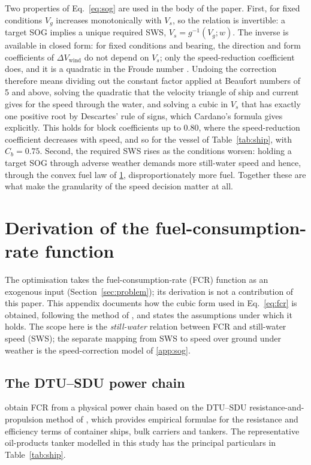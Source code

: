 \documentclass[review,authoryear]{elsarticle}
\begin{document}
Two properties of Eq.~\eqref{eq:sog} are used in the body of the paper. First, for fixed conditions
$V_g$ increases monotonically with $V_s$, so the relation is invertible: a target SOG implies a unique
required SWS, $V_s=g^{-1}(V_g;w)$. The inverse is available in closed form: for fixed conditions and
bearing, the direction and form coefficients of $\Delta V_{\text{wind}}$ do not depend on $V_s$; only
the speed-reduction coefficient does, and it is a quadratic in the Froude number
\citep[Table~3]{yang2020}. Undoing the correction therefore means dividing out the constant factor
applied at Beaufort numbers of 5 and above, solving the quadratic that the velocity triangle of ship
and current gives for the speed through the water, and solving a cubic in $V_s$ that has exactly one
positive root by Descartes' rule of signs, which Cardano's formula gives explicitly. This holds for
block coefficients up to 0.80, where the speed-reduction coefficient decreases with speed, and so
for the vessel of Table~\ref{tab:ship}, with $C_b=0.75$. Second, the required SWS rises as the
conditions worsen: holding a target SOG through adverse
weather demands more still-water speed and hence, through the convex fuel law of
\ref{app:fcr}, disproportionately more fuel. Together these are what make the granularity of
the speed decision matter at all.

\section{Derivation of the fuel-consumption-rate function}
\label{app:fcr}

The optimisation takes the fuel-consumption-rate (FCR) function as an exogenous input
(Section~\ref{sec:problem}); its derivation is not a contribution of this paper. This appendix
documents how the cubic form used in Eq.~\eqref{eq:fcr} is obtained, following the method of
\citet{yang2020}, and states the assumptions under which it holds. The scope here is the
\emph{still-water} relation between FCR and still-water speed (SWS); the separate mapping from SWS to
speed over ground under weather is the speed-correction model of \ref{app:sog}.

\subsection{The DTU--SDU power chain}
\label{app:fcr-chain}
\citet{yang2020} obtain FCR from a physical power chain based on the DTU--SDU resistance-and-propulsion
method of \citet{kristensen2012}, which provides empirical formulae for the resistance and efficiency
terms of container ships, bulk carriers and tankers. The representative oil-products tanker modelled
in this study has the principal particulars in Table~\ref{tab:ship}.
\end{document}
